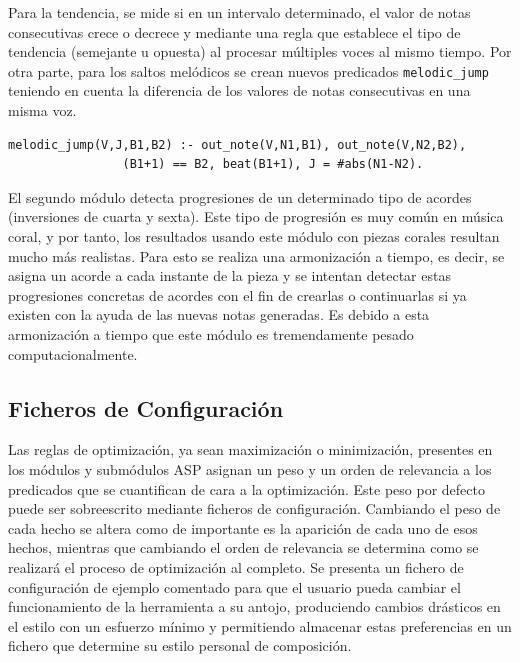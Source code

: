 Para la tendencia, se mide si en un intervalo determinado, el valor de notas consecutivas crece o decrece y mediante una regla que establece el tipo de tendencia (semejante u opuesta) al procesar múltiples voces al mismo tiempo. Por otra parte, para los saltos melódicos se crean nuevos predicados \texttt{melodic\_jump} teniendo en cuenta la diferencia de los valores de notas consecutivas en una misma voz.

\begin{Verbatim}[frame=single]
melodic_jump(V,J,B1,B2) :- out_note(V,N1,B1), out_note(V,N2,B2),
             	(B1+1) == B2, beat(B1+1), J = #abs(N1-N2). 
\end{Verbatim}

El segundo módulo detecta progresiones de un determinado tipo de acordes (inversiones de cuarta y sexta). Este tipo de progresión es muy común en música coral, y por tanto, los resultados usando este módulo con piezas corales resultan mucho más realistas. Para esto se realiza una armonización a tiempo, es decir, se asigna un acorde a cada instante de la pieza y se intentan detectar estas progresiones concretas de acordes con el fin de crearlas o continuarlas si ya existen con la ayuda de las nuevas notas generadas. Es debido a esta armonización a tiempo que este módulo es tremendamente pesado computacionalmente.

\subsection{Ficheros de Configuración}
Las reglas de optimización, ya sean maximización o minimización, presentes en los módulos y submódulos ASP asignan un peso y un orden de relevancia a los predicados que se cuantifican de cara a la optimización. Este peso por defecto puede ser sobreescrito mediante ficheros de configuración. Cambiando el peso de cada hecho se altera como de importante es la aparición de cada uno de esos hechos, mientras que cambiando el orden de relevancia se determina como se realizará el proceso de optimización al completo.
Se presenta un fichero de configuración de ejemplo comentado para que el usuario pueda cambiar el funcionamiento de la herramienta a su antojo, produciendo cambios drásticos en el estilo con un esfuerzo mínimo y permitiendo almacenar estas preferencias en un fichero que determine su estilo personal de composición.

